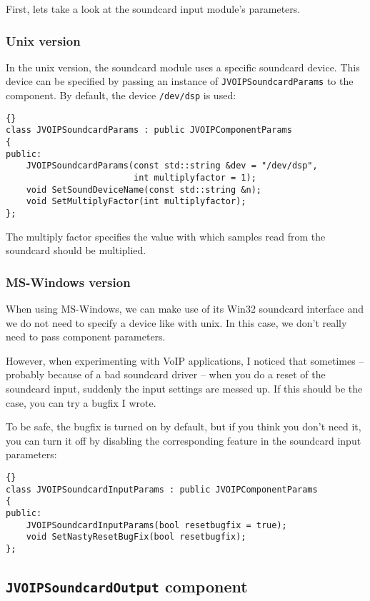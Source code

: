 		First, lets take a look at the soundcard input module's parameters.
		
			\subsubsection{Unix version}
			
			In the unix version, the soundcard module uses a specific soundcard
			device. This device can be specified by passing an instance of
			{\tt JVOIPSoundcardParams} to the component. By default, the device
			{\tt /dev/dsp} is used:
			
			\begin{lstlisting}[frame=tb]{}
class JVOIPSoundcardParams : public JVOIPComponentParams
{
public:
	JVOIPSoundcardParams(const std::string &dev = "/dev/dsp", 
	                     int multiplyfactor = 1);
	void SetSoundDeviceName(const std::string &n);
	void SetMultiplyFactor(int multiplyfactor);
};
			\end{lstlisting}
			The multiply factor specifies the value with which samples read from
			the soundcard should be multiplied.
			
			\subsubsection{MS-Windows version}
			
			When using MS-Windows, we can make use of its Win32 soundcard interface
			and we do not need to specify a device like with unix. In this case,
			we don't really need to pass component parameters.
			
			However, when experimenting with VoIP applications, I noticed that
			sometimes -- probably because of a bad soundcard driver -- when you
			do a reset of the soundcard input, suddenly the input settings are
			messed up. If this should be the case, you can try a bugfix I wrote.
			
			To be safe, the bugfix is turned on by default, but if you think
			you don't need it, you can turn it off by disabling the corresponding
			feature in the soundcard input parameters:
			
			\begin{lstlisting}[frame=tb]{}
class JVOIPSoundcardInputParams : public JVOIPComponentParams
{
public:
	JVOIPSoundcardInputParams(bool resetbugfix = true);
	void SetNastyResetBugFix(bool resetbugfix);
};
			\end{lstlisting}
			
		\subsection{{\tt JVOIPSoundcardOutput} component}
		
